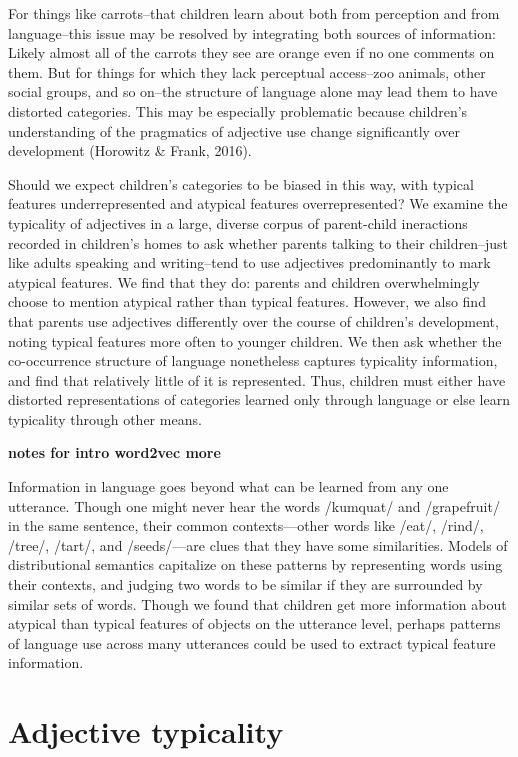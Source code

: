 \documentclass[10pt, letterpaper]{article}
\begin{document}
For things like carrots--that children learn about both from perception
and from language--this issue may be resolved by integrating both
sources of information: Likely almost all of the carrots they see are
orange even if no one comments on them. But for things for which they
lack perceptual access--zoo animals, other social groups, and so on--the
structure of language alone may lead them to have distorted categories.
This may be especially problematic because children's understanding of
the pragmatics of adjective use change significantly over development
(Horowitz \& Frank, 2016).

Should we expect children's categories to be biased in this way, with
typical features underrepresented and atypical features overrepresented?
We examine the typicality of adjectives in a large, diverse corpus of
parent-child ineractions recorded in children's homes to ask whether
parents talking to their children--just like adults speaking and
writing--tend to use adjectives predominantly to mark atypical features.
We find that they do: parents and children overwhelmingly choose to
mention atypical rather than typical features. However, we also find
that parents use adjectives differently over the course of children's
development, noting typical features more often to younger children. We
then ask whether the co-occurrence structure of language nonetheless
captures typicality information, and find that relatively little of it
is represented. Thus, children must either have distorted
representations of categories learned only through language or else
learn typicality through other means.

\textbf{notes for intro word2vec more}

Information in language goes beyond what can be learned from any one
utterance. Though one might never hear the words /kumquat/ and
/grapefruit/ in the same sentence, their common contexts---other words
like /eat/, /rind/, /tree/, /tart/, and /seeds/---are clues that they
have some similarities. Models of distributional semantics capitalize on
these patterns by representing words using their contexts, and judging
two words to be similar if they are surrounded by similar sets of words.
Though we found that children get more information about atypical than
typical features of objects on the utterance level, perhaps patterns of
language use across many utterances could be used to extract typical
feature information.

\hypertarget{adjective-typicality}{%
\section{Adjective typicality}\label{adjective-typicality}}
\end{document}
